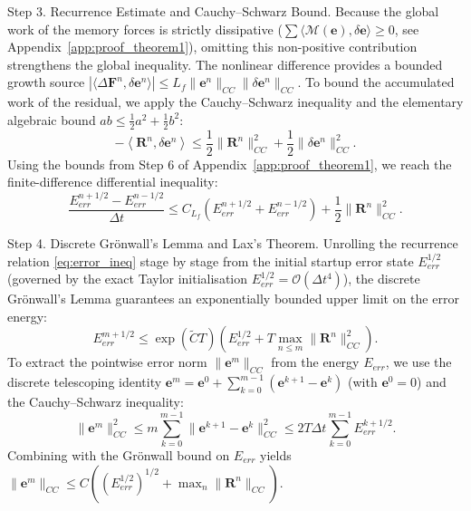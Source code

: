 \documentclass[a4paper,fleqn]{cas-sc}
\begin{document}
\begin{appendix}
Step 3. Recurrence Estimate and Cauchy--Schwarz Bound. 
Because the global work of the memory forces is strictly dissipative ($\sum \langle \mathcal{M}(\mathbf{e}), \delta \mathbf{e} \rangle \ge 0$, see Appendix~\ref{app:proof_theorem1}), omitting this non-positive contribution strengthens the global inequality. The nonlinear difference provides a bounded growth source $|\langle \Delta\mathbf{F}^n, \delta\mathbf{e}^n \rangle| \le L_f \|\mathbf{e}^n\|_{CC} \|\delta\mathbf{e}^n\|_{CC}$. To bound the accumulated work of the residual, we apply the Cauchy--Schwarz inequality and the elementary algebraic bound $ab \le \frac{1}{2}a^2 + \frac{1}{2}b^2$:
\begin{equation}
- \left\langle \boldsymbol{R}^n, \delta \mathbf{e}^n \right\rangle \le \frac{1}{2} \|\boldsymbol{R}^n\|_{CC}^2 + \frac{1}{2} \|\delta \mathbf{e}^n\|_{CC}^2.
\end{equation}
Using the bounds from Step 6 of Appendix~\ref{app:proof_theorem1}, we reach the finite-difference differential inequality:
\begin{equation}\label{eq:error_ineq}
\frac{E_{err}^{n+1/2} - E_{err}^{n-1/2}}{\Delta t} \le C_{L_f} (E_{err}^{n+1/2} + E_{err}^{n-1/2}) + \frac{1}{2} \|\boldsymbol{R}^n\|_{CC}^2.
\end{equation}

Step 4. Discrete Gr\"onwall's Lemma and Lax's Theorem. 
Unrolling the recurrence relation \eqref{eq:error_ineq} stage by stage from the initial startup error state $E_{err}^{1/2}$ (governed by the exact Taylor initialisation $E_{err}^{1/2} = \mathcal{O}(\Delta t^4)$), the discrete Gr\"onwall's Lemma guarantees an exponentially bounded upper limit on the error energy:
\begin{equation}
E_{err}^{m+1/2} \le \exp(\widetilde{C} T) \left( E_{err}^{1/2} + T \max_{n \le m} \|\boldsymbol{R}^n\|_{CC}^2 \right).
\end{equation}
To extract the pointwise error norm $\|\mathbf{e}^m\|_{CC}$ from the energy $E_{err}$, we use the discrete telescoping identity $\mathbf{e}^m = \mathbf{e}^0 + \sum_{k=0}^{m-1}(\mathbf{e}^{k+1}-\mathbf{e}^k)$ (with $\mathbf{e}^0 = 0$) and the Cauchy--Schwarz inequality:
\begin{equation}
\|\mathbf{e}^m\|_{CC}^2 \le m \sum_{k=0}^{m-1} \|\mathbf{e}^{k+1}-\mathbf{e}^k\|_{CC}^2 \le 2T\Delta t \sum_{k=0}^{m-1} E_{err}^{k+1/2}.
\end{equation}
Combining with the Gr\"onwall bound on $E_{err}$ yields $\|\mathbf{e}^m\|_{CC} \le C \left( (E_{err}^{1/2})^{1/2} + \max_n \|\boldsymbol{R}^n\|_{CC} \right)$.


\end{appendix}
\end{document}
